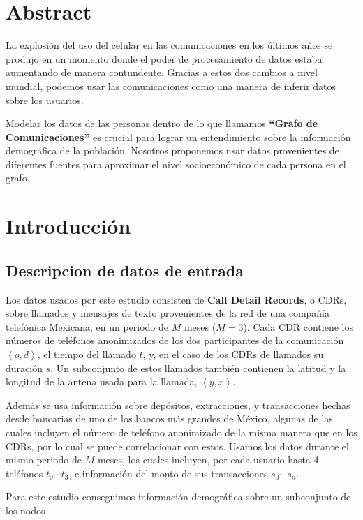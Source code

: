 \documentclass{article}
\begin{document}
\section{Abstract}

La explosi\'on del uso del celular en las comunicaciones en los \'ultimos a\~nos se produjo en un momento donde el poder de procesamiento de datos estaba aumentando de manera contundente. Gracias a estos dos cambios a nivel mundial, podemos usar las comunicaciones como una manera de inferir datos sobre los usuarios.

Modelar los datos de las personas dentro de lo que llamamos \textbf{``Grafo de Comunicaciones''} es crucial para lograr un entendimiento sobre la informaci\'on demogr\'afica de la poblaci\'on. Nosotros proponemos usar datos provenientes de diferentes fuentes para aproximar el nivel socioecon\'omico de cada persona en el grafo.

\section{Introducci\'on}


\subsection{Descripcion de datos de entrada}

Los datos usados por este estudio consisten de \textbf{Call Detail Records}, o CDRs, sobre llamados y mensajes de texto provenientes de la red de una compa\~n\'ia telef\'onica Mexicana, en un periodo de \( M \) meses (\( M = 3 \)). Cada CDR contiene los n\'umeros de tel\'efonos anonimizados de los dos participantes de la comunicaci\'on \(\left<o, d\right>\), el tiempo del llamado \(t\), y, en el caso de los CDRs de llamados su duraci\'on \(s\). Un subconjunto de estos llamados tambi\'en contienen la latitud y la longitud de la antena usada para la llamada, \(\left<y, x\right>\).

Adem\'as se usa informaci\'on sobre dep\'ositos, extracciones, y transacciones hechas desde bancarias de uno de los bancos m\'as grandes de M\'exico, algunas de las cuales incluyen el n\'umero de tel\'efono anonimizado de la misma manera que en los CDRs, por lo cual se puede correlacionar con estos. Usamos los datos durante el mismo periodo de \( M \) meses, los cuales incluyen, por cada usuario hasta 4 tel\'efonos \( t_0 \cdots t_3 \), e informaci\'on del monto de sus transacciones \( s_0 \cdots s_n \).

Para este estudio conseguimos informaci\'on demogr\'afica sobre un subconjunto de los nodos
\end{document}
